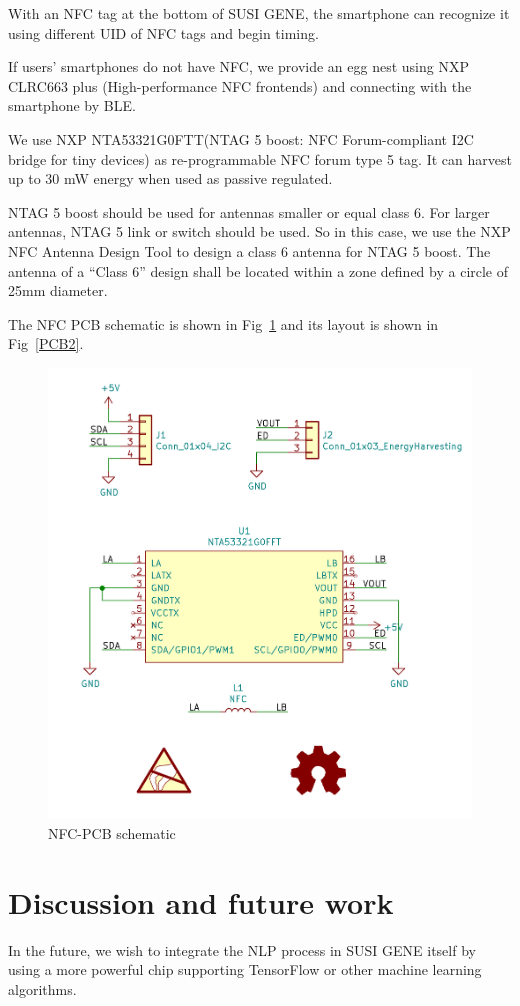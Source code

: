 \documentclass[manuscript,screen]{acmart}
\begin{document}
With an NFC tag at the bottom of SUSI GENE, the smartphone can recognize it using different UID of NFC tags and begin timing.

If users' smartphones do not have NFC, we provide an egg nest using NXP CLRC663 plus (High-performance NFC frontends) and connecting with the smartphone by BLE.

We use NXP NTA53321G0FTT(NTAG 5 boost: NFC Forum-compliant I2C bridge for tiny devices) as re-programmable NFC forum type 5 tag. It can harvest up to 30 mW energy when used as passive regulated.

NTAG 5 boost should be used for antennas smaller or equal class 6. For larger antennas, NTAG 5 link or switch should be used. So in this case, we use the NXP NFC Antenna Design Tool to design a class 6 antenna for NTAG 5 boost. The antenna of a “Class 6” design shall be located within a zone defined by a circle of 25mm diameter.

The NFC PCB schematic is shown in Fig~\ref{PCBsch2} and its layout is shown in Fig~\ref{PCB2}.

\begin{figure}[h]
  \centering
  \includegraphics[width=0.7\linewidth]{PCBsch2.png}
  \caption{NFC-PCB schematic}
  \label{PCBsch2}
\end{figure}

\section{Discussion and future work}

In the future, we wish to integrate the NLP process in SUSI GENE itself by using a more powerful chip supporting TensorFlow or other machine learning algorithms. 
\end{document}
